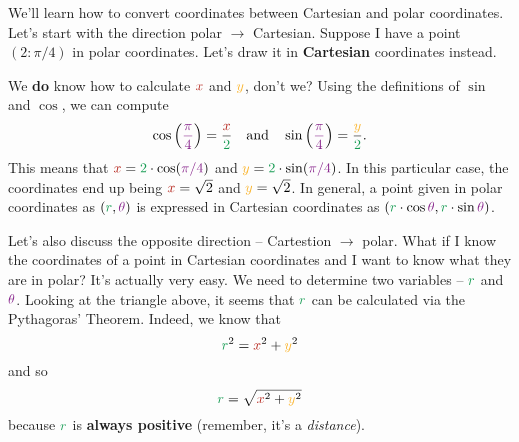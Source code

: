 \documentclass[a4paper,11pt]{article}
\newcommand{\clr}{\textcolor{BrickRed}}
\newcommand{\clg}{\textcolor{ForestGreen}}
\newcommand{\clm}{\textcolor{Fuchsia}}
\newcommand{\cly}{\textcolor{Dandelion}}
\begin{document}
We'll learn how to convert coordinates between Cartesian and polar coordinates.
Let's start with the direction polar $ \to $ Cartesian. Suppose I have a point
$(2:\pi / 4)$ in polar coordinates. Let's draw it in \textbf{Cartesian}
coordinates instead.
\begin{center}
\end{center}
We \textbf{do} know how to calculate $\clr{x}$ and $\cly{y}$, don't we? Using
the definitions of $\sin$ and $\cos$, we can compute
\[
 \cos \left( \clm{\frac{\pi}{4}} \right) = \frac{\clr{x}}{\clg{2}} \quad
 \text{and} \quad \sin \left( \clm{\frac{\pi}{4}} \right) =
 \frac{\cly{y}}{\clg{2}}.
\]
This means that $\clr{x} = \clg{2} \cdot \cos(\clm{\pi / 4})$ and $\cly{y} =
\clg{2} \cdot \sin(\clm{\pi / 4})$. In this particular case, the coordinates end
up being $\clr{x} = \sqrt{2}$ and $\cly{y} = \sqrt{2}$. In general, a point
given in polar coordinates as $(\clg{r},\clm{\theta})$ is expressed in Cartesian
coordinates as $(\clg{r} \cdot \cos\clm{\theta},\clg{r} \cdot \sin
\clm{\theta})$.

Let's also discuss the opposite direction -- Cartestion $ \to $ polar. What if I
know the coordinates of a point in Cartesian coordinates and I want to know what
they are in polar? It's actually very easy. We need to determine two variables
-- $\clg{r}$ and $\clm{\theta}$. Looking at the triangle above, it seems that
$\clg{r}$ can be calculated via the Pythagoras' Theorem. Indeed, we know that
\[
 \clg{r}^2 = \clr{x}^2 + \cly{y}^2
\]
and so
\[
 \clg{r} = \sqrt{\clr{x}^2 + \cly{y}^2}
\]
because $\clg{r}$ is \textbf{always positive} (remember, it's a
\emph{distance}).
\end{document}
